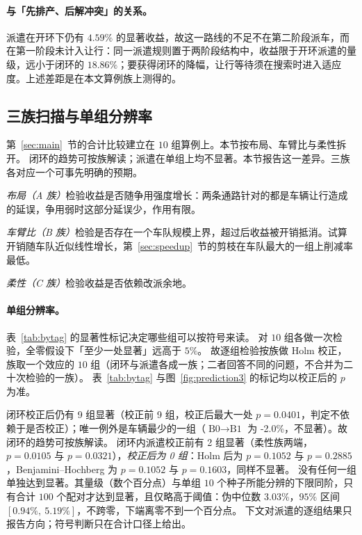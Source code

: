 \documentclass[manuscript,screen,review]{acmart}
\newcommand{\NCases}{10}
\newcommand{\NSeeds}{10}
\newcommand{\NPairs}{100}
\newcommand{\GainLoopRule}{18.86\%}      %
\newcommand{\GainProbeOpen}{4.59\%}      %
\newcommand{\HLProbeLoop}{3.03\%}
\newcommand{\CIProbeLoop}{$[0.94\%,\ 5.19\%]$}
\newcommand{\CellsSigLoop}{9}
\newcommand{\CellsSigLoopAdj}{9}
\newcommand{\CellsSigProbe}{2}
\newcommand{\CellsSigProbeAdj}{0}
\newcommand{\GainLoopStarve}{-2.0\%}     %
\newcommand{\PProbeFlexLoRaw}{=0.0105}
\newcommand{\PProbeFlexLoHolm}{=0.1052}
\newcommand{\PProbeFlexLoBH}{=0.1052}
\newcommand{\PProbeFlexHiRaw}{=0.0321}
\newcommand{\PProbeFlexHiHolm}{=0.2885}
\newcommand{\PProbeFlexHiBH}{=0.1603}
\newcommand{\PLoopCellMax}{=0.0401}
\begin{document}
\paragraph{与「先排产、后解冲突」的关系。}
派遣在开环下仍有 $\GainProbeOpen$ 的显著收益，故这一路线的不足不在第二阶段派车，而在第一阶段未计入让行：同一派遣规则置于两阶段结构中，收益限于开环派遣的量级，远小于闭环的 $\GainLoopRule$；要获得闭环的降幅，让行等待须在搜索时进入适应度。上述差距是在本文算例族上测得的。

\subsection{三族扫描与单组分辨率}
\label{sec:whichcongestion}

第~\ref{sec:main}~节的合计比较建立在 $\NCases$ 组算例上。本节按布局、车臂比与柔性拆开。
闭环的趋势可按族解读；派遣在单组上均不显著。本节报告这一差异。三族各对应一个可事先明确的预期。

\emph{布局（A 族）}检验收益是否随争用强度增长：两条通路针对的都是车辆让行造成的延误，争用弱时这部分延误少，作用有限。

\emph{车臂比（B 族）}检验是否存在一个车队规模上界，超过后收益被开销抵消。试算开销随车队近似线性增长，第~\ref{sec:speedup}~节的剪枝在车队最大的一组上削减率最低。

\emph{柔性（C 族）}检验收益是否依赖改派余地。

\paragraph{单组分辨率。}
表~\ref{tab:bytag} 的显著性标记决定哪些组可以按符号来读。
对 $\NCases$ 组各做一次检验，全零假设下「至少一处显著」远高于 $5\%$。
故逐组检验按族做 Holm 校正，族取一个效应的 $\NCases$ 组（闭环与派遣各成一族；二者回答不同的问题，不合并为二十次检验的一族）。
表~\ref{tab:bytag} 与图~\ref{fig:prediction3} 的标记均以校正后的 $p$ 为准。

闭环校正后仍有 \CellsSigLoopAdj{} 组显著（校正前 \CellsSigLoop{} 组，校正后最大一处 $p\PLoopCellMax$，判定不依赖于是否校正）；唯一例外是车辆最少的一组（$\text{B0}\to\text{B1}$ 为 \GainLoopStarve{}，不显著）。故闭环的趋势可按族解读。
闭环内派遣校正前有 \CellsSigProbe{} 组显著（柔性族两端，$p\PProbeFlexLoRaw$ 与 $p\PProbeFlexHiRaw$），\emph{校正后为 \CellsSigProbeAdj{} 组}：Holm 后为 $p\PProbeFlexLoHolm$ 与 $p\PProbeFlexHiHolm$，Benjamini--Hochberg 为 $p\PProbeFlexLoBH$ 与 $p\PProbeFlexHiBH$，同样不显著。
没有任何一组单独达到显著。其量级（数个百分点）与单组 $\NSeeds$ 个种子所能分辨的下限同阶，只有合计 $\NPairs$ 个配对才达到显著，且仅略高于阈值：伪中位数 \HLProbeLoop{}，$95\%$ 区间 \CIProbeLoop{}，不跨零，下端离零不到一个百分点。
下文对派遣的逐组结果只报告方向；符号判断只在合计口径上给出。
\end{document}
